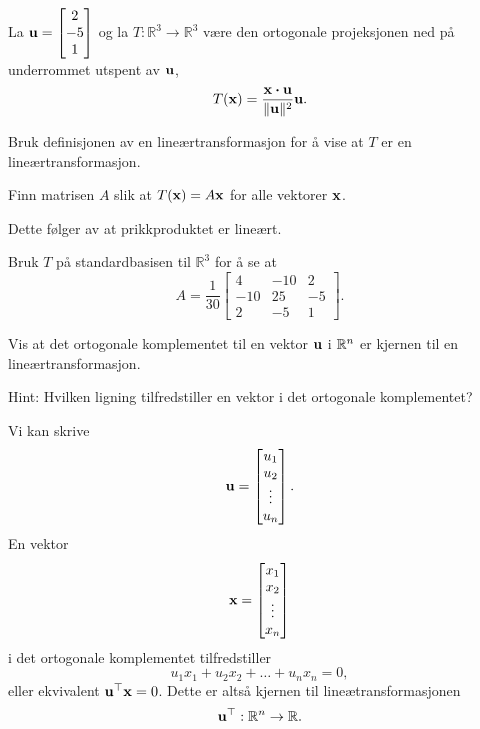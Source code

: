 
\begin{oppgave}
La $\mathbf{u}=\begin{bmatrix} 2 \\ -5 \\ 1 \end{bmatrix}$ og la $T:\mathbb{R}^3\rightarrow \mathbb{R}^3$ være den ortogonale projeksjonen ned på underrommet utspent av $\mathbf{u}$,
$$T(\mathbf{x})=\frac{\mathbf{x}\boldsymbol{\cdot} \mathbf{u}}{\|\mathbf{u} \|^2} \mathbf{u}.$$

\begin{punkt}
Bruk definisjonen av en lineærtransformasjon for å vise at $T$ er en lineærtransformasjon.
\end{punkt}

\begin{punkt}
Finn matrisen $A$ slik at $T(\mathbf{x})=A\mathbf{x}$ for alle vektorer $\mathbf{x}$.
\end{punkt}

\end{oppgave}

\begin{losning}

\begin{punkt}
Dette følger av at prikkproduktet er lineært.
\end{punkt}

\begin{punkt}
Bruk $T$ på standardbasisen til $\mathbb{R}^3$ for å se at
$$A=\frac{1}{30}\begin{bmatrix}
4 & -10 & 2\\
-10 & 25 & -5\\
2 & -5 & 1
\end{bmatrix}.$$
\end{punkt}

\end{losning}

\begin{oppgave}
Vis at det ortogonale komplementet til en vektor $\mathbf{u}$ i $\mathbb{R}^n$
er kjernen til en lineærtransformasjon.

\noindent
Hint: Hvilken ligning tilfredstiller en vektor i det ortogonale komplementet?
\end{oppgave}

\begin{losning}
Vi kan skrive
\[
\mathbf{u}=\begin{bmatrix}
u_1\\
u_2\\
\vdots\\
u_n\\
\end{bmatrix}.
\]
En vektor
\[
\mathbf{x}=\begin{bmatrix}
x_1\\
x_2\\
\vdots\\
x_n\\
\end{bmatrix}
\]
i det ortogonale komplementet tilfredstiller
\[
u_1x_1+u_2x_2+\dots +u_nx_n=0,
\]
eller ekvivalent $\mathbf{u}^\top \mathbf{x}=0$.
Dette er altså kjernen til lineætransformasjonen
\[
\mathbf{u}^\top:\mathbb{R}^n\rightarrow \mathbb{R}.
\]
\end{losning}


